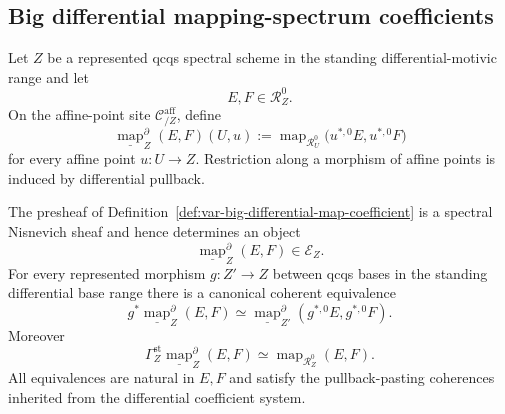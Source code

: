 \subsection{Big differential mapping-spectrum coefficients}

\begin{definition}
\label{def:var-big-differential-map-coefficient}
Let \(Z\) be a represented qcqs spectral scheme in the standing differential-motivic range and let
\[
    E,F\in\mathcal R_Z^0.
\]
On the affine-point site \(\mathcal C^{\mathrm{aff}}_{/Z}\), define
\[
    \boxed{
    \underline{\operatorname{map}}^{\partial}_{Z}(E,F)(U,u)
    :=
    \operatorname{map}_{\mathcal R_U^0}
    \bigl(u^{*,0}E,u^{*,0}F\bigr)
    }
\]
for every affine point \(u:U\to Z\). Restriction along a morphism of affine points is induced by differential pullback.
\end{definition}

\begin{theorem}
\label{thm:var-big-differential-map-coefficient}
The presheaf of Definition~\ref{def:var-big-differential-map-coefficient} is a spectral Nisnevich sheaf and hence determines an object
\[
    \underline{\operatorname{map}}^{\partial}_{Z}(E,F)
    \in
    \mathcal E_Z.
\]
For every represented morphism \(g:Z'\to Z\) between qcqs bases in the standing differential base range there is a canonical coherent equivalence
\[
    \boxed{
    g^*\underline{\operatorname{map}}^{\partial}_{Z}(E,F)
    \simeq
    \underline{\operatorname{map}}^{\partial}_{Z'}
    (g^{*,0}E,g^{*,0}F).
    }
\]
Moreover
\[
    \boxed{
    \Gamma_Z^{\mathrm{st}}
    \underline{\operatorname{map}}^{\partial}_{Z}(E,F)
    \simeq
    \operatorname{map}_{\mathcal R_Z^0}(E,F).
    }
\]
All equivalences are natural in \(E,F\) and satisfy the pullback-pasting coherences inherited from the differential coefficient system.
\end{theorem}

